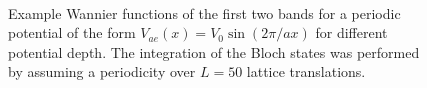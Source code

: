 \begin{figure}
    \\
    \caption{Example Wannier functions of the first two bands for a periodic potential of the form $V_{ae}(x)=V_0\sin(2\pi/ax)$ for different potential depth. The integration of the Bloch states was performed by assuming a periodicity over $L=50$ lattice translations.}
    \label{fig:tight_binding_wanniers}
\end{figure}

